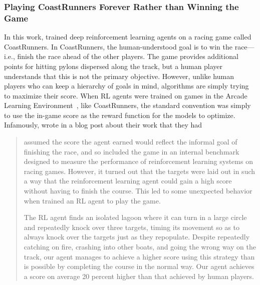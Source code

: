 
\subsubsection{Playing CoastRunners Forever Rather than Winning the Game~\citep{amodei2016concrete, OpenAI_Faulty_2016}}
\label{sec:boatracing}

In this work, \citeauthor{amodei2016concrete} trained deep reinforcement learning agents on a racing game called CoastRunners. 
In CoastRunners, the human-understood goal is to win the race---i.e., finish the race ahead of the other players.
The game provides additional points for hitting pylons dispersed along the track, but a human player understands that this is not the primary objective.
However, unlike human players who can keep a hierarchy of goals in mind, algorithms are simply trying to maximize their score.
When RL agents were trained on games in the Arcade Learning Environment~\citep{bellemare13arcade}, like CoastRunners, the standard convention was simply to use the in-game score as the reward function for the models to optimize.
Infamously, \citet{amodei2016concrete} wrote in a blog post about their work that they had

\begin{quote}
assumed the score the agent earned would reflect the informal goal of finishing the race, and so included the game in an internal benchmark designed to measure the performance of reinforcement learning systems on racing games. However, it turned out that the targets were laid out in such a way that the reinforcement learning agent could gain a high score without having to finish the course. This led to some unexpected behavior when \citeauthor{amodei2016concrete} trained an RL agent to play the game.

The RL agent finds an isolated lagoon where it can turn in a large circle and repeatedly knock over three targets, timing its movement so as to always knock over the targets just as they repopulate. Despite repeatedly catching on fire, crashing into other boats, and going the wrong way on the track, our agent manages to achieve a higher score using this strategy than is possible by completing the course in the normal way. Our agent achieves a score on average 20 percent higher than that achieved by human players.
\end{quote}

